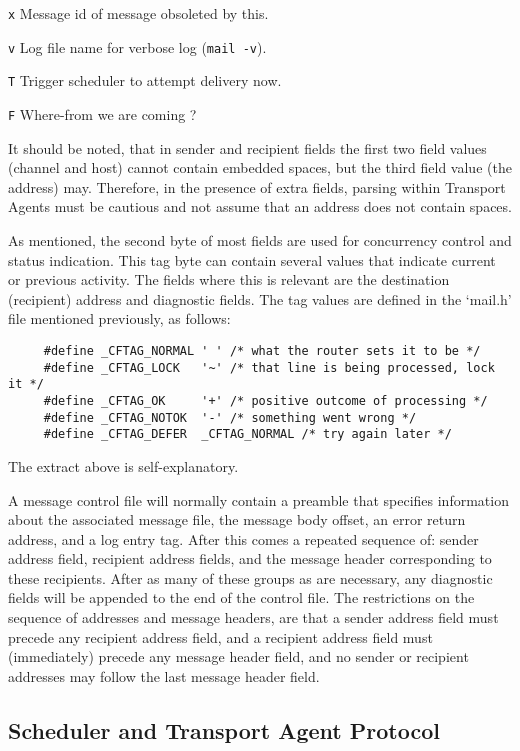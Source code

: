 {\tt x}
Message id of message obsoleted by this.

{\tt v}
Log file name for verbose log ({\tt mail -v}).

{\tt T}
Trigger scheduler to attempt delivery now.

{\tt F}
Where-from we are coming ?               

It should be noted, that in sender and recipient fields the first two field
values (channel and host) cannot contain embedded spaces, but the third
field value (the address) may.  Therefore, in the presence of extra fields,
parsing within Transport Agents must be cautious and not assume that an
address does not contain spaces.

As mentioned, the second byte of most fields are used for concurrency
control and status indication.  This tag byte can contain several values
that indicate current or previous activity.  The fields where this is
relevant are the destination (recipient) address and diagnostic fields.
The tag values are defined in the `mail.h' file mentioned previously, as
follows:
\begin{verbatim}
     #define _CFTAG_NORMAL ' ' /* what the router sets it to be */
     #define _CFTAG_LOCK   '~' /* that line is being processed, lock it */
     #define _CFTAG_OK     '+' /* positive outcome of processing */
     #define _CFTAG_NOTOK  '-' /* something went wrong */
     #define _CFTAG_DEFER  _CFTAG_NORMAL /* try again later */
\end{verbatim}

The extract above is self-explanatory.

A message control file will normally contain a preamble that specifies
information about the associated message file, the message body offset, an
error return address, and a log entry tag.  After this comes a repeated
sequence of: sender address field, recipient address fields, and the
message header corresponding to these recipients.  After as many of these
groups as are necessary, any diagnostic fields will be appended to the end
of the control file.  The restrictions on the sequence of addresses and
message headers, are that a sender address field must precede any recipient
address field, and a recipient address field must (immediately) precede any
message header field, and no sender or recipient addresses may follow the
last message header field.






\subsection{Scheduler and Transport Agent Protocol}



